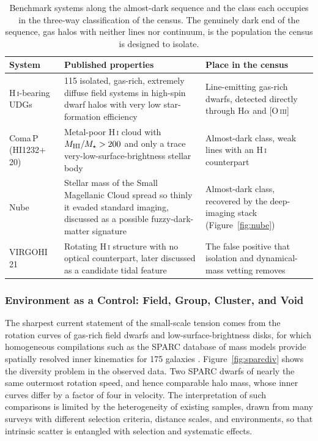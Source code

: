 \documentclass[10pt,onecolumn]{article}
\begin{document}
\begin{table}[tp]
\centering
\sffamily\small
\begin{tabularx}{\textwidth}{@{}p{3.2cm}p{6.4cm}X@{}}
\toprule
\textbf{System} & \textbf{Published properties} & \textbf{Place in the census}\\
\midrule
H\,\textsc{i}-bearing UDGs & 115 isolated, gas-rich, extremely diffuse field systems in high-spin dwarf halos with very low star-formation efficiency \cite{leisman2017} & Line-emitting gas-rich dwarfs, detected directly through H$\alpha$ and [O\,\textsc{iii}]\\
Coma\,P (HI1232$+$20) & Metal-poor H\,\textsc{i} cloud with $M_{\rm HI}/M_\star>200$ and only a trace very-low-surface-brightness stellar body \cite{janowiecki2015} & Almost-dark class, weak lines with an H\,\textsc{i} counterpart\\
Nube & Stellar mass of the Small Magellanic Cloud spread so thinly it evaded standard imaging, discussed as a possible fuzzy-dark-matter signature \cite{montes2024nube} & Almost-dark class, recovered by the deep-imaging stack (Figure~\ref{fig:nube})\\
VIRGOHI\,21 & Rotating H\,\textsc{i} structure with no optical counterpart, later discussed as a candidate tidal feature \cite{minchin2005,duc2008} & The false positive that isolation and dynamical-mass vetting removes\\
\bottomrule
\end{tabularx}
\caption{Benchmark systems along the almost-dark sequence and the class each occupies in the three-way classification of the census. The genuinely dark end of the sequence, gas halos with neither lines nor continuum, is the population the census is designed to isolate.}
\label{tab:darkbench}
\end{table}

\subsubsection{Environment as a Control: Field, Group, Cluster, and Void}

The sharpest current statement of the small-scale tension comes from the rotation curves of gas-rich field dwarfs and low-surface-brightness disks, for which homogeneous compilations such as the SPARC database of mass models provide spatially resolved inner kinematics for 175 galaxies \cite{lelli2016}. Figure~\ref{fig:sparcdiv} shows the diversity problem in the observed data. Two SPARC dwarfs of nearly the same outermost rotation speed, and hence comparable halo mass, whose inner curves differ by a factor of four in velocity. The interpretation of such comparisons is limited by the heterogeneity of existing samples, drawn from many surveys with different selection criteria, distance scales, and environments, so that intrinsic scatter is entangled with selection and systematic effects.
\end{document}

